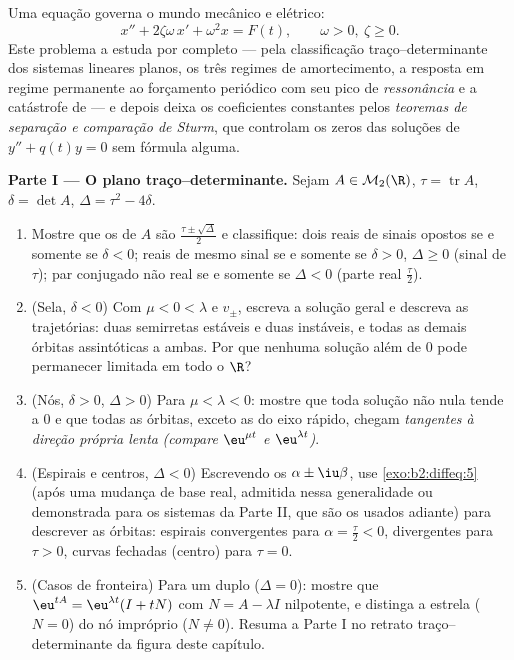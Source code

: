 \begin{problem}\label{pb:b2:diffeq:1}
Uma equação governa o mundo mecânico e elétrico:
\[
x'' + 2\zeta\omega\,x' + \omega^2 x = F(t),
\qquad \omega > 0,\ \zeta \geq 0 .
\]
Este problema a estuda por completo --- pela
classificação traço--determinante dos sistemas lineares planos,
os três regimes de amortecimento, a resposta em regime permanente ao
forçamento periódico com seu pico de \emph{ressonância}
e a catástrofe de  --- e depois deixa os coeficientes
constantes pelos \emph{teoremas de separação e comparação de
Sturm}, que controlam os
zeros das soluções de $y'' + q(t)y = 0$ sem fórmula
alguma.

\medskip
\noindent\textbf{Parte I --- O plano traço--determinante.} Sejam
$A \in \mathcal M_2(\R)$, $\tau = \operatorname{tr}A$, $\delta
= \det A$, $\Delta = \tau^2 - 4\delta$.
\begin{enumerate}
  \item Mostre que os  de $A$ são
        $\frac{\tau\pm\sqrt\Delta}{2}$ e classifique: dois 
        reais de sinais opostos se e somente se $\delta < 0$;
         reais de mesmo sinal se e somente se $\delta > 0$, $\Delta
        \geq 0$ (sinal de $\tau$); par conjugado não real se e somente se
        $\Delta < 0$ (parte real $\frac\tau2$).
  \item (Sela, $\delta < 0$) Com  $\mu < 0 <
        \lambda$ e  $v_\pm$, escreva a solução
        geral e descreva as trajetórias: duas semirretas estáveis e
        duas instáveis, e todas as demais órbitas assintóticas a
        ambas. Por que nenhuma solução além de $0$ pode permanecer limitada em todo
        o $\R$?
  \item (Nós, $\delta > 0$, $\Delta > 0$) Para $\mu < \lambda
        < 0$: mostre que toda solução não nula tende a $0$ e
        que todas as órbitas, exceto as do eixo rápido, chegam
        \emph{tangentes à direção própria lenta}
        \emph{(compare $\eu^{\mu t}$ e $\eu^{\lambda t}$)}.
  \item (Espirais e centros, $\Delta < 0$) Escrevendo os
         $\alpha \pm \iu\beta$, use
        \cref{exo:b2:diffeq:5} (após uma mudança de base real,
        admitida nessa generalidade ou demonstrada para os sistemas
        da Parte II, que são os usados adiante) para descrever
        as órbitas: espirais convergentes para $\alpha =
        \frac\tau2 < 0$, divergentes para $\tau > 0$, curvas
        fechadas (centro) para $\tau = 0$.
  \item (Casos de fronteira) Para um  duplo ($\Delta =
        0$): mostre que $\eu^{tA} = \eu^{\lambda t}(I + tN)$ com $N
        = A - \lambda I$ nilpotente, e distinga a estrela
        ($N = 0$) do nó impróprio ($N \neq 0$).
        Resuma a Parte I no retrato traço--determinante da
        figura deste capítulo.
\end{enumerate}


\end{problem}
